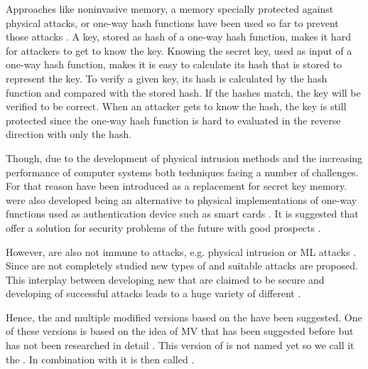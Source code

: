 Approaches like noninvasive memory, a memory specially protected against physical attacks, or one-way hash functions have been used so far to prevent those attacks \cite{Pappu2001PhysicalFunctions}. %
A key, stored as hash of a one-way hash function, makes it hard for attackers to get to know the key. 
Knowing the secret key, used as input of a one-way hash function, makes it is easy to calculate its hash that is stored to represent the key.
To verify a given key, its hash is calculated by the hash function and compared with the stored hash.
If the hashes match, the key will be verified to be correct.
When an attacker gets to know the hash, the key is still protected since the one-way hash function is hard to evaluated in the reverse direction with only the hash. %

Though, due to the development of physical intrusion methods and the increasing performance of computer systems both techniques facing a number of challenges.
For that reason \pufs have been introduced as a replacement for secret key memory.
\pufs were also developed being an alternative to physical implementations of one-way functions used as authentication device such as smart cards \cite{Pappu2001PhysicalFunctions}.
It is suggested that \pufs offer a solution for security problems of the future with good prospects \cite{Tajik2014PhysicalPUFs}.


However, \pufs are also not immune to attacks, e.g. physical intrusion or \acl{ML} attacks \cite{Tajik2014PhysicalPUFs,Ruhrmair2010ModelingFunctions,Becker2015ThePUFs,Helfmeier2014PhysicalFunctions}.
Since \pufs are not completely studied new types of \pufs and suitable attacks are proposed. %
This interplay between developing new \pufs that are claimed to be secure and developing of successful attacks leads to a huge variety of different \pufs \cite{Ruhrmair2014PUFOverview}.

Hence, the \apuf and multiple modified versions based on the \apuf have been suggested. %
One of these versions is based on the idea of \ac{MV} that has been suggested before but has not been researched in detail \cite{Ruhrmair2013PUFData}.
This version of \apufs is not named yet so we call it the \mpuf.
In combination with \xpufs it is then called \mxpufs.

